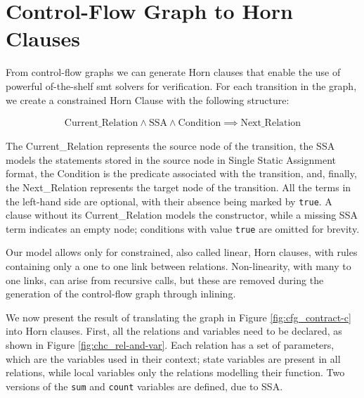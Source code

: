 \section{Control-Flow Graph to Horn Clauses}

From control-flow graphs we can generate Horn clauses that enable the use of powerful of-the-shelf smt solvers for verification. For each transition in the graph, we create a constrained Horn Clause with the following structure:

\begin{align*}
\text{Current\_Relation} \land \text{SSA} \land \text{Condition} \implies \text{Next\_Relation}
\end{align*}

The Current\_Relation represents the source node of the transition, the SSA models the statements stored in the source node in Single Static Assignment format, the Condition is the predicate associated with the transition, and, finally, the Next\_Relation represents the target node of the transition. All the terms in the left-hand side are optional, with their absence being marked by \texttt{true}. A clause without its Current\_Relation models the constructor, while a missing SSA term indicates an empty node; conditions with value \texttt{true} are omitted for brevity.

Our model allows only for constrained, also called linear, Horn clauses, with rules containing only a one to one link between relations. Non-linearity, with many to one links, can arise from recursive calls, but these are removed during the generation of the control-flow graph through inlining.

We now present the result of translating the graph in Figure \ref{fig:cfg_contract-c} into Horn clauses. First, all the relations and variables need to be declared, as shown in Figure \ref{fig:chc_rel-and-var}. Each relation has a set of parameters, which are the variables used in their context; state variables are present in all relations, while local variables only the relations modelling their function. Two versions of the \texttt{sum} and \texttt{count} variables are defined, due to SSA.

